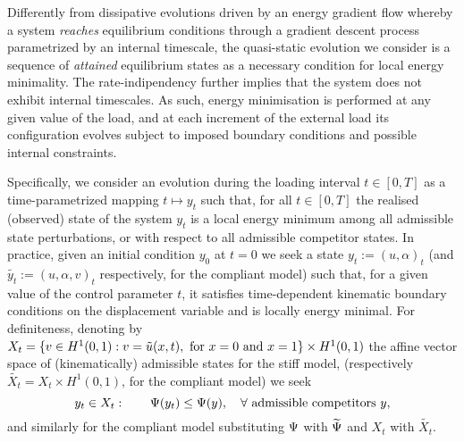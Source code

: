 Differently from dissipative evolutions driven by an energy gradient flow whereby a system \emph{reaches} equilibrium conditions through a gradient descent process parametrized by an internal timescale, the quasi-static evolution we consider is a sequence of \emph{attained} equilibrium states as a necessary condition for local energy minimality. 
The rate-indipendency further implies that the system does not exhibit internal timescales.
As such, energy minimisation is performed at any given value of the load, and at each increment of the external load its configuration evolves subject to imposed boundary conditions and possible internal constraints.
% 

Specifically, we consider an evolution during the loading interval $t\in [0, T]$ as a time-parametrized mapping $t\mapsto y_t$  such that, for all $t\in [0, T]$ the realised (observed) state of the system $y_t$ is a local energy minimum among all admissible state perturbations, or with respect to all admissible competitor states. %
In practice, given an initial condition $y_0$ at $t=0$ we seek a state $y_t:=(u, \alpha)_t$ (and $\widetilde{y_t}:=(u, \alpha, v)_t$ respectively, for the compliant model) such that, for a given value of the control parameter $t$, it satisfies time-dependent kinematic boundary conditions on the displacement variable and is locally energy minimal. 
For definiteness, denoting by $X_t = \{v\in H^1(0, 1):v=\tilde u(x, t),\text{ for } x=0\text{ and } x=1\}\times H^1(0,1)$ the affine vector space of (kinematically) admissible states for the stiff model, (respectively $\widetilde{X_t} = X_t\times H^1(0, 1)$, for the compliant model) 
we seek 
\begin{equation}
    \label{eq:variational_global_ineq}
    y_t\in X_t: \qquad \Psi(y_t) \leq \Psi(y),\quad \forall \text{ admissible competitors } y,
\end{equation}
and similarly for the compliant model substituting $\Psi$ with $\widetilde\Psi$ and $X_t$ with $\widetilde{X_t}$.

